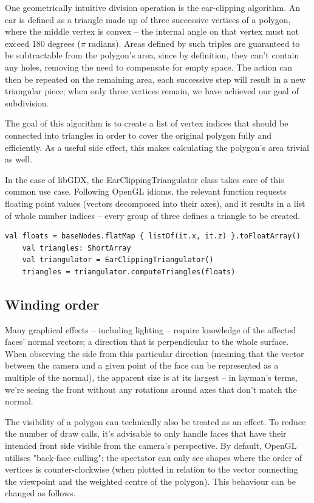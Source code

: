 One geometrically intuitive division operation is the ear-clipping algorithm. An ear is defined as a triangle made up of three successive vertices of a polygon, where the middle vertex is convex -- the internal angle on that vertex must not exceed 180 degrees ($\pi$ radians).\cite{TriangulationByEarClipping} Areas defined by such triples are guaranteed to be subtractable from the polygon's area, since by definition, they can't contain any holes, removing the need to compensate for empty space. The action can then be repeated on the remaining area, each successive step will result in a new triangular piece; when only three vertices remain, we have achieved our goal of subdivision.

The goal of this algorithm is to create a list of vertex indices that should be connected into triangles in order to cover the original polygon fully and efficiently. As a useful side effect, this makes calculating the polygon's area trivial as well.

In the case of libGDX, the EarClippingTriangulator class takes care of this common use case. Following OpenGL idioms, the relevant function requests floating point values (vectors decomposed into their axes), and it results in a list of whole number indices -- every group of three defines a triangle to be created.

\begin{lstlisting}[caption=Example usage of the EarClippingTriangulator class]
    val floats = baseNodes.flatMap { listOf(it.x, it.z) }.toFloatArray()
    val triangles: ShortArray
    val triangulator = EarClippingTriangulator()
    triangles = triangulator.computeTriangles(floats)
\end{lstlisting}

\subsection{Winding order}

Many graphical effects -- including lighting -- require knowledge of the affected faces' normal vectors; a direction that is perpendicular to the whole surface.
When observing the side from this particular direction (meaning that the vector between the camera and a given point of the face can be represented as a multiple of the normal), the apparent size is at its largest -- in layman's terms, we're seeing the front without any rotations around axes that don't match the normal.

The visibility of a polygon can technically also be treated as an effect. To reduce the number of draw calls, it's advisable to only handle faces that have their intended front side visible from the camera's perspective. By default, OpenGL utilises "back-face culling": the spectator can only see shapes where the order of vertices is counter-clockwise (when plotted in relation to the vector connecting the viewpoint and the weighted centre of the polygon). This behaviour can be changed as follows.


